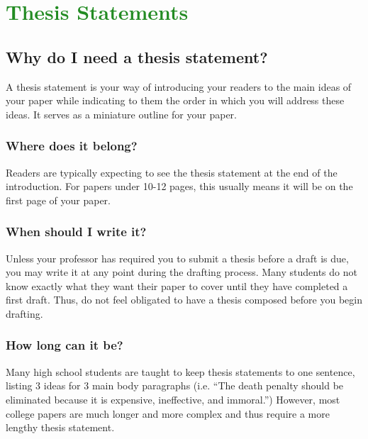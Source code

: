 
\section{\textcolor{ForestGreen}{Thesis Statements}}

\subsection{Why do I need a thesis statement?}

A thesis statement is your way of introducing your readers to the main ideas of your paper while indicating to them the order in which you will address these ideas. It serves as a miniature outline for your paper.

\subsubsection{Where does it belong?}

Readers are typically expecting to see the thesis statement at the end of the introduction. For papers under 10-12 pages, this usually means it will be on the first page of your paper.

\subsubsection{When should I write it?}

Unless your professor has required you to submit a thesis before a draft is due, you may write it at any point during the drafting process. Many students do not know exactly what they want their paper to cover until they have completed a first draft. Thus, do not feel obligated to have a thesis composed before you begin drafting.

\subsubsection{How long can it be?}

Many high school students are taught to keep thesis statements to one sentence, listing 3 ideas for 3 main body paragraphs (i.e. ``The death penalty should be eliminated because it is expensive, ineffective, and immoral.'') However, most college papers are much longer and more complex and thus require a more lengthy thesis statement.

